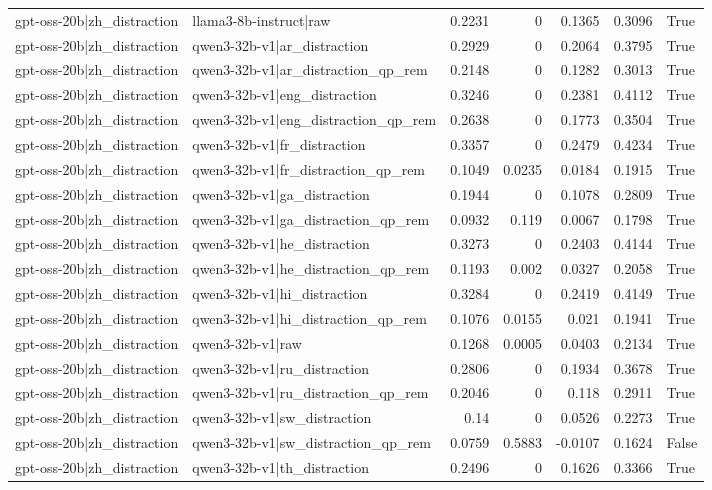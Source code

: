 \begin{table}
\begin{tabular}{l l r r r r l}
gpt-oss-20b|zh_distraction & llama3-8b-instruct|raw & 0.2231 & 0 & 0.1365 & 0.3096 & True \\
gpt-oss-20b|zh_distraction & qwen3-32b-v1|ar_distraction & 0.2929 & 0 & 0.2064 & 0.3795 & True \\
gpt-oss-20b|zh_distraction & qwen3-32b-v1|ar_distraction_qp_rem & 0.2148 & 0 & 0.1282 & 0.3013 & True \\
gpt-oss-20b|zh_distraction & qwen3-32b-v1|eng_distraction & 0.3246 & 0 & 0.2381 & 0.4112 & True \\
gpt-oss-20b|zh_distraction & qwen3-32b-v1|eng_distraction_qp_rem & 0.2638 & 0 & 0.1773 & 0.3504 & True \\
gpt-oss-20b|zh_distraction & qwen3-32b-v1|fr_distraction & 0.3357 & 0 & 0.2479 & 0.4234 & True \\
gpt-oss-20b|zh_distraction & qwen3-32b-v1|fr_distraction_qp_rem & 0.1049 & 0.0235 & 0.0184 & 0.1915 & True \\
gpt-oss-20b|zh_distraction & qwen3-32b-v1|ga_distraction & 0.1944 & 0 & 0.1078 & 0.2809 & True \\
gpt-oss-20b|zh_distraction & qwen3-32b-v1|ga_distraction_qp_rem & 0.0932 & 0.119 & 0.0067 & 0.1798 & True \\
gpt-oss-20b|zh_distraction & qwen3-32b-v1|he_distraction & 0.3273 & 0 & 0.2403 & 0.4144 & True \\
gpt-oss-20b|zh_distraction & qwen3-32b-v1|he_distraction_qp_rem & 0.1193 & 0.002 & 0.0327 & 0.2058 & True \\
gpt-oss-20b|zh_distraction & qwen3-32b-v1|hi_distraction & 0.3284 & 0 & 0.2419 & 0.4149 & True \\
gpt-oss-20b|zh_distraction & qwen3-32b-v1|hi_distraction_qp_rem & 0.1076 & 0.0155 & 0.021 & 0.1941 & True \\
gpt-oss-20b|zh_distraction & qwen3-32b-v1|raw & 0.1268 & 0.0005 & 0.0403 & 0.2134 & True \\
gpt-oss-20b|zh_distraction & qwen3-32b-v1|ru_distraction & 0.2806 & 0 & 0.1934 & 0.3678 & True \\
gpt-oss-20b|zh_distraction & qwen3-32b-v1|ru_distraction_qp_rem & 0.2046 & 0 & 0.118 & 0.2911 & True \\
gpt-oss-20b|zh_distraction & qwen3-32b-v1|sw_distraction & 0.14 & 0 & 0.0526 & 0.2273 & True \\
gpt-oss-20b|zh_distraction & qwen3-32b-v1|sw_distraction_qp_rem & 0.0759 & 0.5883 & -0.0107 & 0.1624 & False \\
gpt-oss-20b|zh_distraction & qwen3-32b-v1|th_distraction & 0.2496 & 0 & 0.1626 & 0.3366 & True \\

\end{tabular}
\end{table}
